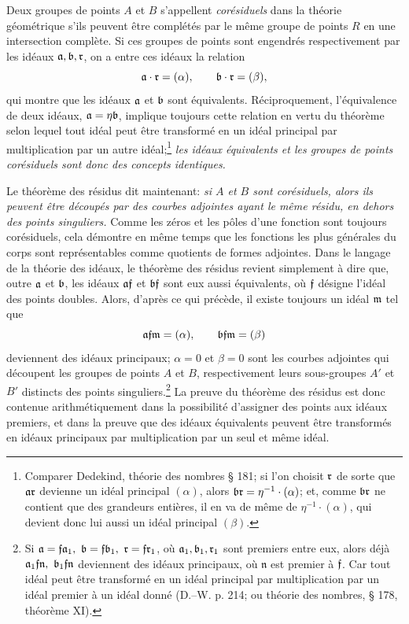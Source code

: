 Deux groupes de points \(A\) et \(B\) s'appellent \emph{corésiduels} dans la théorie géométrique s'ils peuvent être complétés par le même groupe de points \(R\) en une intersection complète. Si ces groupes de points sont engendrés respectivement par les idéaux \(\mathfrak a,\mathfrak b,\mathfrak r\), on a entre ces idéaux la relation
\[
\mathfrak a\cdot\mathfrak r=(\alpha),\qquad \mathfrak b\cdot\mathfrak r=(\beta),
\]
qui montre que les idéaux \(\mathfrak a\) et \(\mathfrak b\) sont équivalents. Réciproquement, l'équivalence de deux idéaux, \(\mathfrak a=\eta\mathfrak b\), implique toujours cette relation en vertu du théorème selon lequel tout idéal peut être transformé en un idéal principal par multiplication par un autre idéal;\footnote{Comparer Dedekind, théorie des nombres \S{} 181; si l'on choisit \(\mathfrak r\) de sorte que \(\mathfrak a\mathfrak r\) devienne un idéal principal \((\alpha)\), alors \(\mathfrak b\mathfrak r=\eta^{-1}\cdot(\alpha)\); et, comme \(\mathfrak b\mathfrak r\) ne contient que des grandeurs entières, il en va de même de \(\eta^{-1}\cdot(\alpha)\), qui devient donc lui aussi un idéal principal \((\beta)\).} \emph{les idéaux équivalents et les groupes de points corésiduels sont donc des concepts identiques.}

Le théorème des résidus dit maintenant: \emph{si \(A\) et \(B\) sont corésiduels, alors ils peuvent être découpés par des courbes adjointes ayant le même résidu, en dehors des points singuliers.} Comme les zéros et les pôles d'une fonction sont toujours corésiduels, cela démontre en même temps que les fonctions les plus générales du corps sont représentables comme quotients de formes adjointes. Dans le langage de la théorie des idéaux, le théorème des résidus revient simplement à dire que, outre \(\mathfrak a\) et \(\mathfrak b\), les idéaux \(\mathfrak a\mathfrak f\) et \(\mathfrak b\mathfrak f\) sont eux aussi équivalents, où \(\mathfrak f\) désigne l'idéal des points doubles. Alors, d'après ce qui précède, il existe toujours un idéal \(\mathfrak m\) tel que
\[
\mathfrak a\mathfrak f\mathfrak m=(\alpha),\qquad \mathfrak b\mathfrak f\mathfrak m=(\beta)
\]
deviennent des idéaux principaux; \(\alpha=0\) et \(\beta=0\) sont les courbes adjointes qui découpent les groupes de points \(A\) et \(B\), respectivement leurs sous-groupes \(A'\) et \(B'\) distincts des points singuliers.\footnote{Si \(\fra=\frf\fra_1,\ \frb=\frf\frb_1,\ \frr=\frf\frr_1\), où \(\mathfrak a_1,\mathfrak b_1,\mathfrak r_1\) sont premiers entre eux, alors déjà \(\fra_1\frf\mathfrak n,\ \frb_1\frf\mathfrak n\) deviennent des idéaux principaux, où \(\mathfrak n\) est premier à \(\mathfrak f\). Car tout idéal peut être transformé en un idéal principal par multiplication par un idéal premier à un idéal donné (D.--W. p. 214; ou théorie des nombres, \S{} 178, théorème XI).} La preuve du théorème des résidus est donc contenue arithmétiquement dans la possibilité d'assigner des points aux idéaux premiers, et dans la preuve que des idéaux équivalents peuvent être transformés en idéaux principaux par multiplication par un seul et même idéal.

